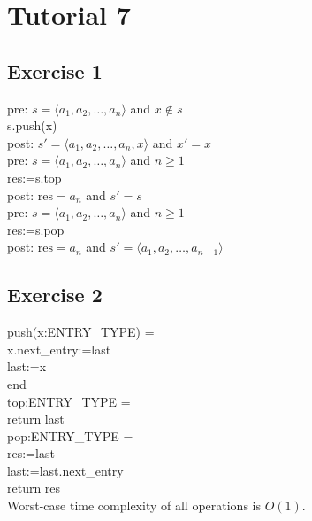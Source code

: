 \documentclass[english]{article}
\begin{document}

\pagestyle{fancy}
 \chead{}

\section*{Tutorial 7}

\subsection*{Exercise 1} 

pre: $s=\langle a_1, a_2, \ldots, a_n\rangle$ and $x \not\in s$ \\[2mm]
\mbox{} \hspace{5mm} s.push(x) \\[2mm]
post: $s'=\langle a_1, a_2, \ldots, a_n, x\rangle$ and $x'=x$ \\[6mm]
pre: $s=\langle a_1, a_2, \ldots, a_n\rangle$ and $n \geq 1$ \\[2mm]
\mbox{} \hspace{5mm} res:=s.top \\[2mm]
post: $\mbox{res}=a_n$ and $s'=s$ \\[6mm]
pre: $s=\langle a_1, a_2, \ldots, a_n\rangle$ and $n\geq 1$ \\[2mm]
\mbox{} \hspace{5mm} res:=s.pop \\[2mm]
post: $\mbox{res}=a_n$ and $s'=\langle a_1, a_2, \ldots, a_{n-1}\rangle$ 
 
\subsection*{Exercise 2} 

push(x:ENTRY\_TYPE) = \\
x.next\_entry:=last \\
last:=x \\
end \\[6mm]
top:ENTRY\_TYPE = \\
return last  \\[6mm]
pop:ENTRY\_TYPE = \\
res:=last \\
last:=last.next\_entry \\
return res \\[4mm]
Worst-case time complexity of all operations is $O(1)$.
\end{document}

